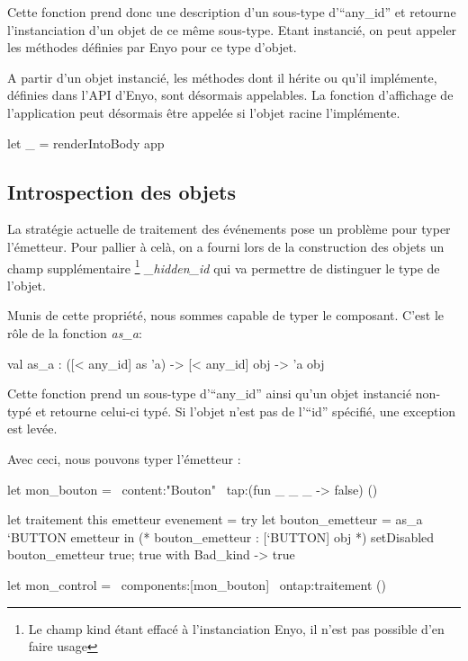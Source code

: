 \documentclass[11pt,a4paper]{report}
\begin{document}
Cette fonction prend donc une description d'un sous-type d'``any\_id'' et retourne 
l'instanciation d'un objet de ce même sous-type. Etant instancié, on peut appeler les méthodes
définies par Enyo pour ce type d'objet.


A partir d'un objet instancié, les méthodes dont il hérite ou qu'il implémente, définies dans l'API d'Enyo,
sont désormais appelables. La fonction d'affichage de l'application peut désormais être appelée si
l'objet racine l'implémente.

\begin{OCaml}
  let _ = renderIntoBody app
\end{OCaml}

\subsection{Introspection des objets}\label{introspec}

La stratégie actuelle de traitement des événements pose un problème pour typer l'émetteur.
Pour pallier à celà, on a fourni lors de la construction des objets un champ supplémentaire
\footnote{Le champ kind étant effacé à l'instanciation Enyo, il n'est pas possible d'en faire usage} 
\emph{\_hidden\_id} qui va permettre de distinguer le type de l'objet.

Munis de cette propriété, nous sommes capable de typer le composant.
C'est le rôle de la fonction \emph{as\_a}:

\begin{OCaml}
  val as_a : ([< any_id] as 'a) -> [< any_id] obj -> 'a obj
\end{OCaml}

Cette fonction prend un sous-type d'``any\_id'' ainsi qu'un objet instancié non-typé et retourne 
celui-ci typé. Si l'objet n'est pas de l'``id'' spécifié, une exception est levée.

Avec ceci, nous pouvons typer l'émetteur :
\begin{OCaml}
  let mon_bouton = ~content:"Bouton" ~tap:(fun _ _ _ -> false) ()

  let traitement this emetteur evenement =
     try 
         let bouton_emetteur = as_a `BUTTON emetteur in
         (* bouton_emetteur : [`BUTTON] obj *)
         setDisabled bouton_emetteur true;
         true
     with Bad_kind -> true

  let mon_control = ~components:[mon_bouton] ~ontap:traitement ()
\end{OCaml}
\end{document}
